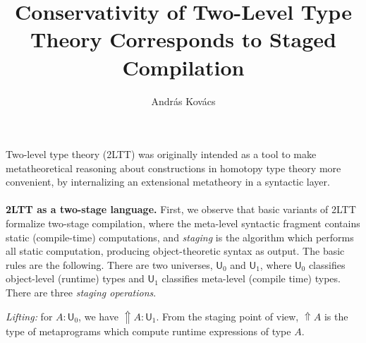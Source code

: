\documentclass{easychair}
\title{Conservativity of Two-Level Type Theory Corresponds to Staged Compilation}
\author{Andr\'as Kov\'acs}
\institute{
  E\"otv\"os Lor\'and University,
  Budapest, Hungary \\
  \email{kovacsandras@inf.elte.hu}
}
\newcommand{\msf}[1]{\mathsf{#1}}
\newcommand{\Lift}{{\Uparrow}}
\newcommand{\U}{\msf{U}}
\theoremstyle{remark}
\begin{document}
\maketitle



Two-level type theory (2LTT) \cite{twolevel} was originally intended as a tool
to make metatheoretical reasoning about constructions in homotopy type theory
more convenient, by internalizing an extensional metatheory in a syntactic
layer.
\\\\
\textbf{2LTT as a two-stage language.} First, we observe that basic variants of
2LTT formalize two-stage compilation, where the meta-level syntactic fragment contains
static (compile-time) computations, and \emph{staging} is the algorithm which
performs all static computation, producing object-theoretic syntax as output. The
basic rules are the following. There are two universes, $\U_0$ and $\U_1$, where
$\U_0$ classifies object-level (runtime) types and $\U_1$ classifies meta-level
(compile time) types. There are three \emph{staging operations}.

\emph{Lifting:} for $A : \U_0$, we have $\Lift A : \U_1$. From the staging point
of view, $\Lift A$ is the type of metaprograms which compute runtime expressions
of type $A$.
\end{document}
